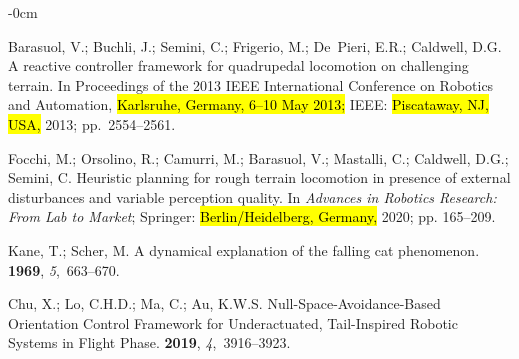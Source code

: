 \documentclass[sensors,article,accept,pdftex,moreauthors]{Definitions/mdpi}
\begin{document}
\begin{adjustwidth}{-\extralength}{0cm}



\begin{thebibliography}{999}

Barasuol, V.; Buchli, J.; Semini, C.; Frigerio, M.; De~Pieri, E.R.; Caldwell,
  D.G.
\newblock A reactive controller framework for quadrupedal locomotion on
  challenging terrain.
\newblock In Proceedings of the 2013 IEEE International Conference on Robotics
  and Automation, \hl{Karlsruhe, Germany, 6--10 May 2013;} %
 IEEE: \hl{Piscataway, NJ, USA,}  2013; pp.~2554--2561.

Focchi, M.; Orsolino, R.; Camurri, M.; Barasuol, V.; Mastalli, C.; Caldwell,
  D.G.; Semini, C.
\newblock Heuristic planning for rough terrain locomotion in presence of
  external disturbances and variable perception quality. In {\em Advances in
  Robotics Research: From Lab to Market}; Springer: \hl{Berlin/Heidelberg, Germany,} %
  2020; pp. 165--209.

Kane, T.; Scher, M.
\newblock A dynamical explanation of the falling cat phenomenon.
 {\bf 1969}, {\em
  5},~663--670.

Chu, X.; Lo, C.H.D.; Ma, C.; Au, K.W.S.
\newblock Null-Space-Avoidance-Based Orientation Control Framework for
  Underactuated, Tail-Inspired Robotic Systems in Flight Phase.
 {\bf 2019}, {\em
  4},~3916--3923.


\end{thebibliography}
\end{adjustwidth}
\end{document}
